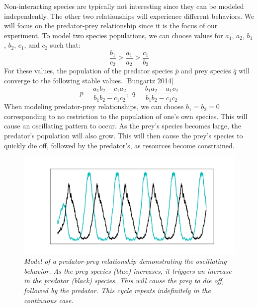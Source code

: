         Non-interacting species are typically not interesting since they can be
        modeled independently.
        The other two relationships will experience different behaviors.
        We will focus on the predator-prey relationship since it is the focus of
        our experiment.
        To model two species populations, we can choose values for
        $a_1$, $a_2$, $b_1$, $b_2$, $c_1$, and $c_2$ such that:
        \begin{equation}\label{eq:inequality}
            \displaystyle \frac{b_1}{c_2} > \frac{a_1}{a_2} > \frac{c_1}{b_2}
        \end{equation}
        For these values, the population of the predator species $\overline{p}$ and
        prey species $\overline{q}$ will converge to the following stable values. [Bungartz 2014]
        \begin{equation}\label{eq:convergence}
            \displaystyle \overline{p} = \frac{a_1 b_2 - c_1 a_2}{b_1 b_2 - c_1 c_2}, \,\,
                          \overline{q} = \frac{b_1 a_2 - a_1 c_2}{b_1 b_2 - c_1 c_2}
        \end{equation}
        When modeling predator-prey relationships, we can choose
        $b_1 = b_2 = 0$ corresponding to no restriction to the population
        of one's own species.
        This will cause an oscillating pattern to occur.
        As the prey's species becomes large, the predator's population will also grow.
        This will then cause the prey's species to quickly die off,
        followed by the predator's, as resources become constrained.

    \begin{figure}[H]
        \includegraphics[width=\linewidth]{./figures/population_dynamics}
        \caption{\textit{
           Model of a predator-prey relationship demonstrating the oscillating behavior.
           As the prey species (blue) increases, it triggers an increase in the
           predator (black) species.
           This will cause the prey to die off, followed by the predator.
           This cycle repeats indefinitely in the continuous case.}}
        \label{fig:population_dynamics}
    \end{figure}


